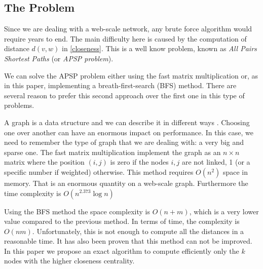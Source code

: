 \clearpage
\subsection{The Problem}

Since we are dealing with a web-scale network, any brute force algorithm would require years to end. The main difficulty here is caused by the computation of distance $d(v,w)$ in \eqref{closeness}. This is a well know problem, known as \emph{All Pairs Shortest Paths} (or \emph{APSP problem}). \s

\noindent We can solve the APSP problem either using the fast matrix multiplication or, as in this paper, implementing a breath-first-search (BFS) method. There are several reason to prefer this second approach over the first one in this type of problems. \s

\noindent A graph is a data structure and we can describe it in different ways \cite{skienna08}. Choosing one over another can have an enormous impact on performance. In this case, we need to remember the type of graph that we are dealing with: a very big and sparse one. The fast matrix multiplication implement the graph as an $n\times n$ matrix where the position $(i,j)$ is zero if the nodes $i,j$ are not linked, 1 (or a specific number if weighted) otherwise. This method requires $O(n^2)$ space in memory. That is an enormous quantity on a web-scale graph. Furthermore the time complexity is $O(n^{2.373} \log n)$ \cite{10.1145/567112.567114}  \s

\noindent Using the BFS method the space complexity is $O(n+m)$, which is a very lower value compared to the previous method. In terms of time, the complexity is $O(nm)$. Unfortunately, this is not enough to compute all the distances in a reasonable time. It has also been proven that this method can not be improved. In this paper we propose an exact algorithm to compute efficiently only the $k$ nodes with the higher closeness centrality.
